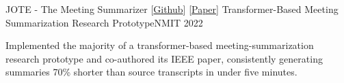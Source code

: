\resumeProject
  {JOTE - The Meeting Summarizer [\href{https://github.com/Sumedhbhat/MeetingSummarizer.git}{Github}] [\href{https://ieeexplore.ieee.org/document/10390455}{Paper}]}
  {Transformer-Based Meeting Summarization Research Prototype}{NMIT}
  {2022}
  \resumeItemListStart
      \item{Implemented the majority of a transformer-based meeting-summarization research prototype and co-authored its IEEE paper, consistently generating summaries 70\% shorter than source transcripts in under five minutes.}
  \resumeItemListEnd
\vspace{2mm}
